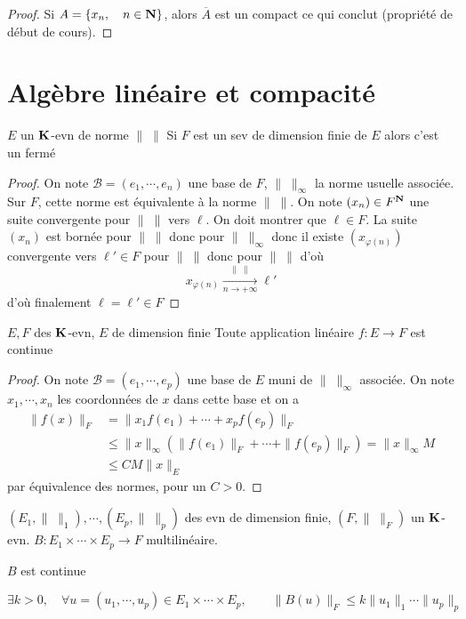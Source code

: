 \begin{proof}
    Si $A= \{x_n, \quad  n \in  \mathbf N\} $, alors $\overline{A}$ est un compact ce qui conclut (propriété de début de cours).
\end{proof}

\section{Algèbre linéaire et compacité}

\begin{thm}
\Hyp $E$ un  $\mathbf K$-evn de norme $\|\;\|$
\Conc Si $F$ est un sev de dimension finie de  $E$ alors c'est un fermé
\end{thm}

\begin{proof}
    On note $\mathcal  B=(e_1,\cdots ,e_n)$ une base de $F$,  $\|\;\|_\infty$ la norme usuelle associée. Sur $F$, cette norme est équivalente à la norme  $\|\;\|$. On note $(x_n) \in  F^{\mathbf N}$ une suite convergente pour $\|\;\|$ vers $\ell $. On doit montrer que $\ell \in F$. La suite $(x_n)$ est bornée pour  $\|\;\|$ donc pour $\|\;\|_\infty$ donc il existe $(x_{\varphi(n)})$ convergente vers $\ell ' \in  F$ pour $\|\;\|$ donc pour $\|\;\|$ d'où \[
        x_{\varphi(n)} \xrightarrow[n\to+\infty]{\|\;\|}\ell '
    \] 
    d'où finalement $\ell =\ell '\in F$
\end{proof}

\begin{thm}
    \Hyp $E,F$ des  $\mathbf K$-evn, $E$ de dimension finie 
    \Conc Toute application linéaire $f:E\to F$ est continue
\end{thm}

\begin{proof}
    On note $\mathcal  B=(e_1,\cdots ,e_p)$ une base de $E$ muni de  $\|\;\|_\infty$ associée. On note $x_1,\cdots,x_n$ les coordonnées de $x$ dans cette base et on a
    \begin{align*}
        \|f(x)\|_F&=\|x_1f(e_1)+\cdots +x_pf(e_p)\|_F \\ &\leq  \|x\|_\infty (\|f(e_1)\|_F+\cdots +\|f(e_p)\|_F)=\|x\|_\infty M \\ &\leq CM \|x\|_E
    \end{align*}
    par équivalence des normes, pour un $C>0$.
\end{proof}

\begin{thm}
    \Hyp $(E_1, \|\;\|_1),\cdots ,(E_p,\|\;\|_p)$ des evn de dimension finie, $(F, \|\;\|_F)$ un $\mathbf K$-evn. $B:E_1\times \cdots \times E_p\to F$ multilinéaire.
    \begin{concenum}
    \item $B$ est continue
    \item  \[
            \exists  k>0, \quad \forall  u=(u_1,\cdots ,u_p)\in E_1\times \cdots \times E_p, \qquad  \|B(u)\|_F \leq  k \|u_1\|_1 \cdots  \|u_p\|_p
    \] 
    \end{concenum}
\end{thm}

